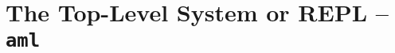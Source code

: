 
\chapter[The Top-Level System or REPL -- aml]{The Top-Level System or REPL -- \lstinline!aml!}
\label{sec:tools-aml}








